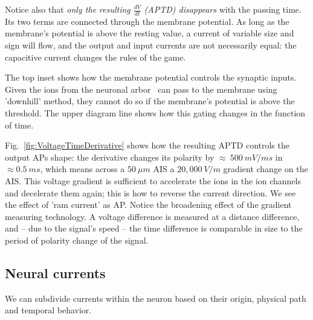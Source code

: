 Notice also that \emph{only the resulting $\frac{dV}{dt}$ 
(APTD)
disappears} with the passing time. Its two terms are connected through
the membrane potential. As long as the membrane's potential is above
the resting value, a current of variable size and sign will flow, and the output and input currents are not necessarily equal: the capacitive current changes the rules of the game.

The top inset shows how the membrane potential controls the synaptic
inputs. Given the ions from the neuronal arbor~\cite{NeuronalArborisation:2021,NeuritsArbor:2022}
can pass to the membrane using 'downhill' method, they cannot do so
if the membrane's potential is above the threshold. The upper diagram
line shows how this gating changes in the function of time.

Fig.~\ref{fig:VoltageTimeDerivative} shows how the resulting 
APTD
controls the output 
APs
 shape: the derivative changes its
polarity by $\approx\ 500\ mV/ms$ in $\approx 0.5\ ms$, which means
across a $50\ \mu m$ 
\gls{AIS} a $20,000\ V/m$ gradient change
on the 
\gls{AIS}.
 This voltage gradient is sufficient to accelerate
the ions in the ion channels and decelerate them again; this is how
to reverse the current direction. We see the effect of 'ram current'
as \gls{AP}.
Notice the broadening effect of the gradient measuring
technology. A voltage difference is measured at a distance difference,
and -- due to the signal's speed -- the time
difference is comparable in size to the period of polarity change
of the signal. 



\subsection{Neural currents\label{sec:Physiology-NeuralCurrents}}
We can subdivide currents within the neuron based on their origin, physical path and temporal behavior.
%

